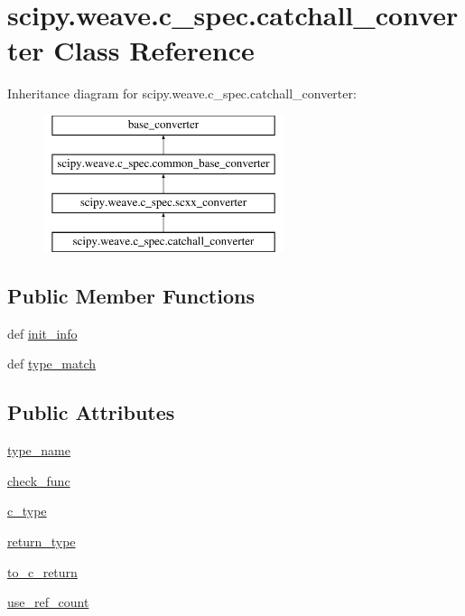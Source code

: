 \hypertarget{classscipy_1_1weave_1_1c__spec_1_1catchall__converter}{}\section{scipy.\+weave.\+c\+\_\+spec.\+catchall\+\_\+converter Class Reference}
\label{classscipy_1_1weave_1_1c__spec_1_1catchall__converter}
Inheritance diagram for scipy.\+weave.\+c\+\_\+spec.\+catchall\+\_\+converter\+:\begin{figure}[H]
\begin{center}
\leavevmode
\includegraphics[height=4.000000cm]{classscipy_1_1weave_1_1c__spec_1_1catchall__converter}
\end{center}
\end{figure}
\subsection*{Public Member Functions}
\begin{DoxyCompactItemize}
\item 
def \hyperlink{classscipy_1_1weave_1_1c__spec_1_1catchall__converter_af11c29cb76bb27c1a0f155432918464d}{init\+\_\+info}
\item 
def \hyperlink{classscipy_1_1weave_1_1c__spec_1_1catchall__converter_acced244b5a9b58bb352555750ea584e3}{type\+\_\+match}
\end{DoxyCompactItemize}
\subsection*{Public Attributes}
\begin{DoxyCompactItemize}
\item 
\hyperlink{classscipy_1_1weave_1_1c__spec_1_1catchall__converter_ab00344b671e945ba61c1f9f7310f442f}{type\+\_\+name}
\item 
\hyperlink{classscipy_1_1weave_1_1c__spec_1_1catchall__converter_a688dfec2a9e822f80814b7774cc3efa3}{check\+\_\+func}
\item 
\hyperlink{classscipy_1_1weave_1_1c__spec_1_1catchall__converter_ac40d191eeed4500f3029fa825d0f3ca8}{c\+\_\+type}
\item 
\hyperlink{classscipy_1_1weave_1_1c__spec_1_1catchall__converter_a288039a4c1ac1ead2ccef3900ddd5fac}{return\+\_\+type}
\item 
\hyperlink{classscipy_1_1weave_1_1c__spec_1_1catchall__converter_ab60a94acd3f26b43dc273436fc39c195}{to\+\_\+c\+\_\+return}
\item 
\hyperlink{classscipy_1_1weave_1_1c__spec_1_1catchall__converter_a47df5ce445ce176c1b026aeedb07bd30}{use\+\_\+ref\+\_\+count}
\end{DoxyCompactItemize}


